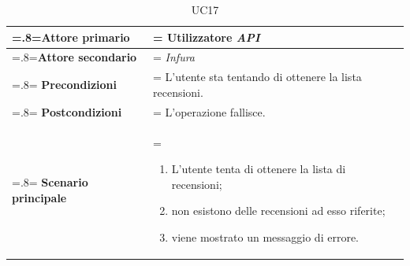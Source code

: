             \begin{table}[H]
                \centering
                \renewcommand{\arraystretch}{1.8}
                \renewcommand\tabularxcolumn[1]{m{#1}}
                \begin{tabularx}{0.9\textwidth} {
                    >{\hsize=.8\hsize\linewidth=\hsize}X
                    >{\hsize=1.2\hsize\linewidth=\hsize}X}
                    \hline
                    \textbf{Attore primario} & Utilizzatore \textit{API} \\
                    \hline
                    \textbf{Attore secondario} & \textit{Infura} \\
                    \hline
                    \textbf{Precondizioni} & L'utente sta tentando di ottenere la lista recensioni. \\
                    \hline
                    \textbf{Postcondizioni} & L'operazione fallisce. \\
                    \hline
                    \textbf{Scenario principale} &
                        \begin{enumerate}
                            \item L'utente tenta di ottenere la lista di recensioni;
                            \item non esistono delle recensioni ad esso riferite;
                            \item viene mostrato un messaggio di errore.
                        \end{enumerate} \\
                    \hline
                \end{tabularx}
                \caption{UC17}
            \end{table}

\pagebreak